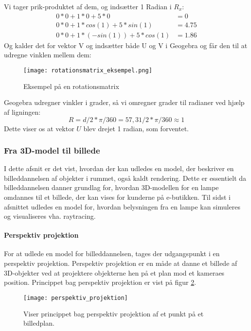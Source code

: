 Vi tager prik-produktet af dem, og indsætter 1 Radian i $R_x$:
\begin{align}
  0*0+1*0+5*0&=0\\
  0*0+1*cos(1)+5*sin(1)&=4.75\\
  0*0+1*(-sin(1))+5*cos(1)&=1.86
\end{align}
Og kalder det for vektor V og indsætter både U og V i Geogebra og får den til at udregne vinklen mellem dem:
\begin{figure}[H]
  \center\texttt{[image: rotationsmatrix\_eksempel.png]}
  \center\caption{Eksempel på en rotationsmatrix}
  \label{fig:rotationsmatrix_eksempel}
\end{figure}
Geogebra udregner vinkler i grader, så vi omregner grader til radianer ved hjælp af ligningen:
\begin{equation}
  R=d/2*\pi/360=57,31/2*\pi/360\approx1
\end{equation}
Dette viser os at vektor $U$ blev drejet 1 radian, som forventet.

\subsubsection{Fra 3D-model til billede}
I dette afsnit er det vist, hvordan der kan udledes en model, der beskriver en billeddannelsen af objekter i rummet, også kaldt rendering. Dette er essentielt da billeddannelsen danner grundlag for, hvordan 3D-modellen for en lampe omdannes til et billede, der kan vises for kunderne på e-butikken. Til sidst i afsnittet udledes en model for, hvordan belysningen fra en lampe kan simuleres og visualiseres vha. raytracing. 

\paragraph{Perspektiv projektion}
For at udlede en model for billeddannelsen, tages der udgangspunkt i en perspektiv projektion. Perspektiv projektion er en måde at danne et billede af 3D-objekter ved at projektere objekterne hen på et plan mod et kameraes position\cite{fig:perspective_projection}. Princippet bag perspektiv projektion er vist på figur \ref{fig:perspektiv_projektion}.

\begin{figure}[H]
  \label{fig:perspektiv_projektion}
  \centering
  \texttt{[image: perspektiv\_projektion]}
  \caption{Viser princippet bag perspektiv projektion af et punkt på et billedplan.}
\end{figure}

